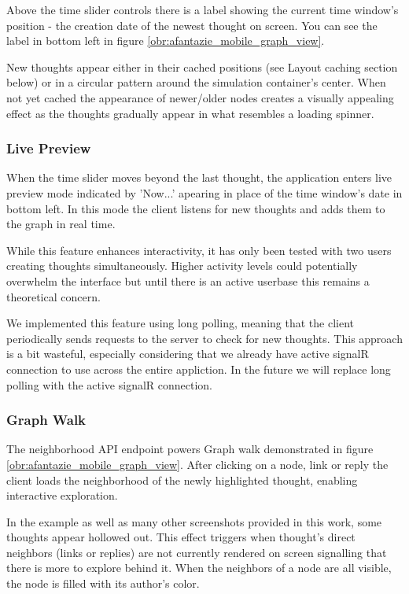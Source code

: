Above the time slider controls there is a label showing the current time window's position - the creation date of the newest thought on screen.
You can see the label in bottom left in figure \ref{obr:afantazie_mobile_graph_view}.

New thoughts appear either in their cached positions (see Layout caching section below) or in a circular pattern around the simulation container’s center.
When not yet cached the appearance of newer/older nodes creates a visually appealing effect as the thoughts gradually appear in what resembles a loading spinner.

\subsubsection*{Live Preview}
When the time slider moves beyond the last thought, the application enters live preview mode indicated by 'Now...' apearing in place of the time window's date in bottom left.
In this mode the client listens for new thoughts and adds them to the graph in real time.

While this feature enhances interactivity, it has only been tested with two users creating thoughts simultaneously.
Higher activity levels could potentially overwhelm the interface but until there is an active userbase this remains
a theoretical concern.

We implemented this feature using long polling, meaning that the client periodically sends
requests to the server to check for new thoughts. This approach is a bit wasteful, especially considering that we already have active
signalR connection to use across the entire appliction.
In the future we will replace long polling with the active signalR connection.

\subsubsection*{Graph Walk}
The neighborhood API endpoint powers Graph walk demonstrated in figure \ref{obr:afantazie_mobile_graph_view}.
After clicking on a node, link or reply the client loads the neighborhood of the newly highlighted thought, enabling interactive exploration.

In the example as well as many other screenshots provided in this work, some thoughts appear hollowed out.
This effect triggers when thought's direct neighbors (links or replies) are not currently rendered on screen
signalling that there is more to explore behind it.
When the neighbors of a node are all visible, the node is filled with its author's color.

